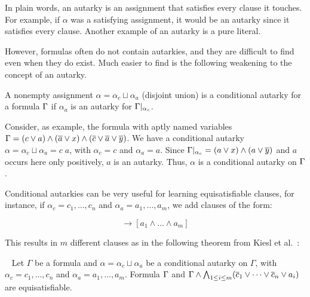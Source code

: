 In plain words, an autarky is an assignment that satisfies every clause it touches. For example, if $\alpha$ was a satisfying assignment, it would be an autarky since it satisfies every clause. Another example of an autarky is a pure literal.

However, formulas often do not contain autarkies, and they are difficult to find even when they do exist. Much easier to find is the following weakening to the concept of an autarky. 

\begin{definition}
    A nonempty assignment $\alpha = \alpha_c \sqcup \alpha_a$ (disjoint union) is a conditional autarky for a formula $\Gamma$ if $\alpha_a$ is an autarky for $\Gamma|_{\alpha_c}$.
\end{definition}

Consider, as example, the formula with aptly named variables $\Gamma = (c \lor a) \land (\overline{a} \lor x) \land (\overline{c} \lor \overline{a} \lor \overline{y})$. We have a conditional autarky $\alpha = \alpha_c \sqcup \alpha_a = c\;a$, with $\alpha_c = c$ and $\alpha_a = a$. Since $\Gamma|_{\alpha_c} = (a \lor x) \land (a \lor \overline{y})$ and $a$ occurs here only positively, $a$ is an autarky. Thus, $\alpha$ is a conditional autarky on $\Gamma$.


Conditional autarkies can be very useful for learning equisatisfiable clauses, for instance, if $\alpha_c = c_1, \dots, c_n$ and $\alpha_a = a_1, \dots, a_m$, we add clauses of the form:

\begin{equation*}
    [c_1 \land \dots \land c_n] \rightarrow [a_1 \land \dots \land a_m]
\end{equation*}

This results in $m$ different clauses as in the following theorem from Kiesl et al.~\cite{conditionalautarkies}:

\begin{theorem}~\label{thm:gbcequisat}
    Let $\Gamma$ be a formula and $\alpha = \alpha_c \sqcup \alpha_a$ be a conditional autarky on $\Gamma$, with $\alpha_c = c_1, \dots, c_n$ and $\alpha_a = a_1, \dots, a_m$. Formula $\Gamma$ and $\Gamma \land \bigwedge_{1 \leq i \leq m} (\overline{c}_1 \lor \dots \lor \overline{c}_n \lor a_i)$ are equisatisfiable.
\end{theorem}

